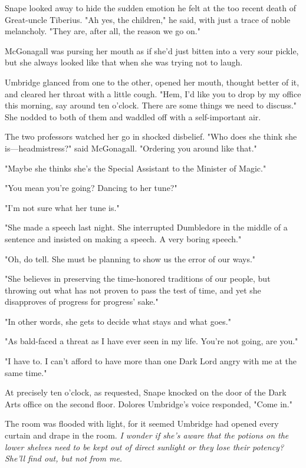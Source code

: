 Snape looked away to hide the sudden emotion he felt at the too recent death of Great-uncle Tiberius. "Ah yes, the children," he said, with just a trace of noble melancholy. "They are, after all, the reason we go on."

McGonagall was pursing her mouth as if she'd just bitten into a very sour pickle, but she always looked like that when she was trying not to laugh.

Umbridge glanced from one to the other, opened her mouth, thought better of it, and cleared her throat with a little cough. "Hem, I'd like you to drop by my office this morning, say around ten o'clock. There are some things we need to discuss." She nodded to both of them and waddled off with a self-important air.

The two professors watched her go in shocked disbelief. "Who does she think she is—headmistress?" said McGonagall. "Ordering you around like that."

"Maybe she thinks she's the Special Assistant to the Minister of Magic."

"You mean you're going? Dancing to her tune?"

"I'm not sure what her tune is."

"She made a speech last night. She interrupted Dumbledore in the middle of a sentence and insisted on making a speech. A very boring speech."

"Oh, do tell. She must be planning to show us the error of our ways."

"She believes in preserving the time-honored traditions of our people, but throwing out what has not proven to pass the test of time, and yet she disapproves of progress for progress' sake."

"In other words, she gets to decide what stays and what goes."

"As bald-faced a threat as I have ever seen in my life. You're not going, are you."

"I have to. I can't afford to have more than one Dark Lord angry with me at the same time."

At precisely ten o'clock, as requested, Snape knocked on the door of the Dark Arts office on the second floor. Dolores Umbridge's voice responded, "Come in."

The room was flooded with light, for it seemed Umbridge had opened every curtain and drape in the room. \emph{I wonder if she's aware that the potions on the lower shelves need to be kept out of direct sunlight or they lose their potency? She'll find out, but not from me.}

